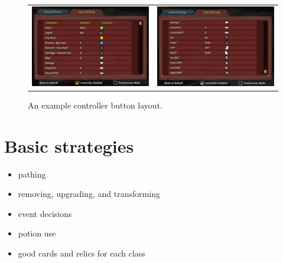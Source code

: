 \documentclass[12pt]{amsart}
\begin{document}
\begin{figure}[h]
    \centering
    \begin{tabular}{c|c}
        \includegraphics[scale=.25]{graphics/InputSettings1.PNG} & 
        \includegraphics[scale=.25]{graphics/InputSettings2.PNG}
    \end{tabular}
    \caption{An example controller button layout.  }
    \label{fig: controller layout}
\end{figure}
\section{Basic strategies}
\begin{itemize}
    \item pathing
    \item removing, upgrading, and transforming
    \item event decisions
    \item potion use
    \item good cards and relics for each class
\end{itemize}
\end{document}
